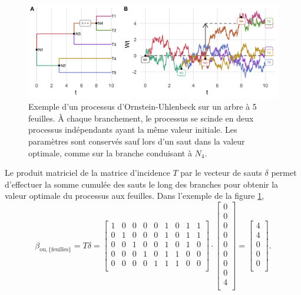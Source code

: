 \documentclass[12pt,a4paper]{reedthesis}
\newcommand \oui [2]{{#1}_{\text{ou},#2}}
\newcommand \shifts {\delta}
\newcommand \optim {\beta}
\theoremstyle{definition}
\theoremstyle{definition}
\theoremstyle{definition}
\theoremstyle{remark}
\begin{document}
\begin{figure}

{\centering \includegraphics[width=0.9\linewidth]{img/tree_ou} 

}

\caption{Exemple d'un processus d'Ornstein-Uhlenbeck sur un arbre à 5 feuilles. À chaque branchement, le processus se scinde en deux processus indépendants ayant la même valeur initiale. Les paramètres sont conservés sauf lors d'un saut dans la valeur optimale, comme sur la branche conduisant à \(N_4\).}\label{fig:treeou}
\end{figure}
Le produit matriciel de la matrice d'incidence \(T\) par le vecteur de sauts \(\shifts\) permet d'effectuer la somme cumulée des sauts le long des branches pour obtenir la valeur optimale du processus aux feuilles. Dans l'exemple de la figure \ref{fig:treeou},
\begin{equation*}
\oui{\optim}{\{\text{feuilles}\}} = T \shifts = 
\begin{bmatrix}
1 & 0 & 0 & 0 & 0 & 1 & 0 & 1 & 1 \\
0 & 1 & 0 & 0 & 0 & 1 & 0 & 1 & 1 \\
0 & 0 & 1 & 0 & 0 & 1 & 0 & 1 & 0 \\
0 & 0 & 0 & 1 & 0 & 1 & 1 & 0 & 0 \\
0 & 0 & 0 & 0 & 1 & 1 & 1 & 0 & 0 \\
\end{bmatrix}
\cdot
\begin{bmatrix}
0 \\
0 \\
0 \\
0 \\
0 \\
0 \\
0 \\
0 \\
4 \\
\end{bmatrix} 
= 
\begin{bmatrix}
4 \\
4 \\
0 \\
0 \\
0 \\
\end{bmatrix}.
\end{equation*}
\newline
\end{document}
